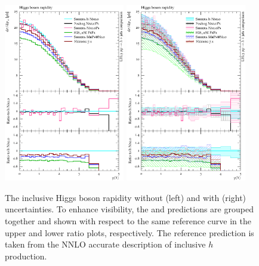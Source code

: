 \begin{figure}[t!]
  \centering
  \includegraphics[width=0.47\textwidth]{figures/hjetscomp_u_H_y.pdf}
  \hfill
  \includegraphics[width=0.47\textwidth]{figures/hjetscomp_H_y.pdf}
  \caption{\label{fig:hjetscomp:results:inclobs:hy}%
    The inclusive Higgs boson rapidity without (left) and with (right)
    uncertainties. To enhance visibility, the \NNLOPS and \MEPSatNLO
    predictions are grouped together and shown with respect to the same reference
    curve in the upper and lower ratio plots, respectively. The
    reference prediction is taken from the NNLO accurate description
    of inclusive $h$ production.}
\end{figure}

